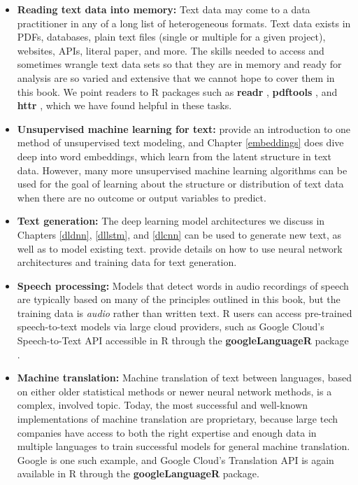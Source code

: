 \documentclass[
]{krantz}
\begin{document}
\begin{itemize}
\item
  \textbf{Reading text data into memory:} Text data may come to a data practitioner in any of a long list of heterogeneous formats. Text data exists in PDFs, databases, plain text files (single or multiple for a given project), websites, APIs, literal paper, and more. The skills needed to access and sometimes wrangle text data sets so that they are in memory and ready for analysis are so varied and extensive that we cannot hope to cover them in this book. We point readers to R packages such as \textbf{readr} \citep{R-readr}, \textbf{pdftools} \citep{R-pdftools}, and \textbf{httr} \citep{R-httr}, which we have found helpful in these tasks.
\item
  \textbf{Unsupervised machine learning for text:} \citet{Silge2017} provide an introduction to one method of unsupervised text modeling, and Chapter \ref{embeddings} does dive deep into word embeddings, which learn from the latent structure in text data. However, many more unsupervised machine learning algorithms can be used for the goal of learning about the structure or distribution of text data when there are no outcome or output variables to predict.
\item
  \textbf{Text generation:} The deep learning model architectures we discuss in Chapters \ref{dldnn}, \ref{dllstm}, and \ref{dlcnn} can be used to generate new text, as well as to model existing text. \citet{Chollet2018} provide details on how to use neural network architectures and training data for text generation.
\item
  \textbf{Speech processing:} Models that detect words in audio recordings of speech are typically based on many of the principles outlined in this book, but the training data is \emph{audio} rather than written text. R users can access pre-trained speech-to-text models via large cloud providers, such as Google Cloud's Speech-to-Text API accessible in R through the \textbf{googleLanguageR} package \citep{R-googleLanguageR}.
\item
  \textbf{Machine translation:} Machine translation of text between languages, based on either older statistical methods or newer neural network methods, is a complex, involved topic. Today, the most successful and well-known implementations of machine translation are proprietary, because large tech companies have access to both the right expertise and enough data in multiple languages to train successful models for general machine translation. Google is one such example, and Google Cloud's Translation API is again available in R through the \textbf{googleLanguageR} package.
\end{itemize}
\end{document}
